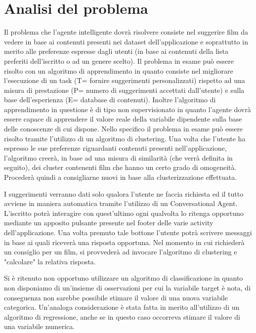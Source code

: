 \documentclass[a4paper, 10pt]{report}
\begin{document}
        \section{Analisi del problema}\label{sec:analisi-del-problema}

    Il problema che l'agente intelligente dovrà risolvere consiste nel suggerire film da vedere in base ai contenuti
    presenti nei dataset dell'applicazione e soprattutto in merito alle preferenze espresse dagli utenti (in base ai
    contenuti della lista preferiti dell'iscritto o ad un genere scelto).
    Il problema in esame può essere risolto con un algoritmo di apprendimento in quanto consiste nel migliorare l'esecuzione
    di un task (T= fornire suggerimenti personalizzati) rispetto ad una misura di prestazione (P= numero di suggerimenti accettati
    dall'utente) e sulla base dell'esperienza (E= database di contenuti). Inoltre l'algoritmo di apprendimento
    in questione è di tipo non supervisionato in quanto l'agente dovrà essere capace di apprendere il valore reale della
    variabile dipendente sulla base delle conoscenze di cui dispone.
    Nello specifico il problema in esame può essere risolto tramite l'utilizzo di un algoritmo di clustering. Una volta che l'utente
    ha espresso le sue preferenze riguardanti contenuti presenti nell'applicazione, l'algoritmo creerà, in base ad una misura di similarità
    (che verrà definita in seguito), dei cluster contenenti film che hanno un certo grado di omogeneità. Procederà quindi a consigliarne nuovi
    in base alla clusterizzazione effettuata.


    I suggerimenti verranno dati solo qualora l'utente ne faccia richiesta ed il tutto avviene in maniera automatica tramite l'utilizzo
    di un Conversational Agent. L'iscritto potrà interagire con quest'ultimo ogni qualvolta lo ritenga opportuno mediante un apposito
    pulsante presente nel footer delle varie activity dell'applicazione. Una volta premuto tale bottone l'utente potrà scrivere messaggi
    in base ai quali riceverà una risposta opportuna. Nel momento in cui richiederà un consiglio per un film, si provvederà ad invocare
    l'algoritmo di clustering e "calcolare" la relativa risposta.

    Si è ritenuto non opportuno utilizzare un algoritmo di classificazione in quanto non disponiamo di un'insieme di osservazioni per cui
    la variabile target è nota, di conseguenza non sarebbe possibile stimare il valore di una nuova variabile categorica.
    Un'analoga considerazione è stata fatta in merito all'utilizzo di un algoritmo di regressione, anche se in questo caso occorreva
    stimare il valore di una variabile numerica.
\end{document}
